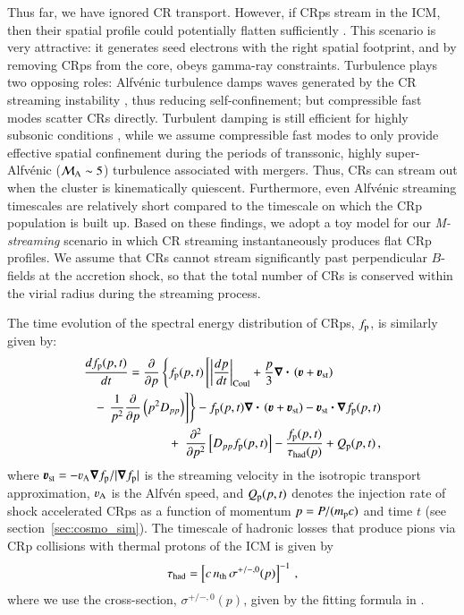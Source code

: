 \documentclass[fleqn,usenatbib,useAMS]{mnras}
\newcommand{\bcdot}{\ensuremath{%
  \mathchoice%
   {\mskip\thinmuskip\lower0.2ex\hbox{\scalebox{1.5}{$\cdot$}}\mskip\thinmuskip}}%
   {\mskip\thinmuskip\lower0.2ex\hbox{\scalebox{1.5}{$\cdot$}}\mskip\thinmuskip}%
   {\lower0.3ex\hbox{\scalebox{1.2}{$\cdot$}}}%
   {\lower0.3ex\hbox{\scalebox{1.2}{$\cdot$}}}%
}
\newcommand{\Mstream}{{\it M-streaming}\xspace}
\newcommand{\bvel}{\ensuremath{\boldsymbol{\varv}}}
\newcommand{\bnabla}{\ensuremath{\boldsymbol{\nabla}}}
\begin{document}
Thus far, we have ignored CR transport. However, if CRps stream in the ICM, then
their spatial profile could potentially flatten sufficiently
\citep{ensslin11,wiener13}. This scenario is very attractive: it generates seed
electrons with the right spatial footprint, and by removing CRps from the core,
obeys gamma-ray constraints. Turbulence plays two opposing roles: Alfv{\'e}nic
turbulence damps waves generated by the CR streaming instability
\citep{yan02,farmer04}, thus reducing self-confinement; but compressible fast
modes scatter CRs directly. Turbulent damping is still efficient for highly
subsonic conditions \citep{wiener13}, while we assume compressible fast modes to
only provide effective spatial confinement during the periods of transsonic,
highly super-Alfv{\'e}nic ($\mathcal{M}_{\rm A} \sim 5$) turbulence associated with
mergers. Thus, CRs can stream out when the cluster is kinematically
quiescent. Furthermore, even Alfv{\'e}nic streaming timescales are relatively
short \cite[$\sim 0.1-0.5$ Gyr;][]{wiener13} compared to the timescale on which
the CRp population is built up. Based on these findings, we adopt a toy model
for our \Mstream scenario in which CR streaming instantaneously produces flat
CRp profiles. We assume that CRs cannot stream significantly past perpendicular
$B$-fields at the accretion shock, so that the total number of CRs is conserved
within the virial radius during the streaming process. 

The time evolution of the spectral energy distribution of CRps,
$f_{{\mathrm{p}}}$, is similarly given by:
\begin{eqnarray}
\lefteqn{
  {{d f_{\rmn{p}}(p,t)}\over{d t}} =
  {{\partial }\over{\partial p}}
  \left\{
  f_{\rmn{p}}(p,t)\left[ \left|{{d p}\over{d t}}\right|_{\rm Coul}
    + \frac{p}{3}\bnabla\bcdot \left(\bvel+\bvel_{\rmn{st}}\right)\right.\right.}
\nonumber\\
&&-\left.\left. {1\over{p^2}}{{\partial }\over{\partial p}}\left(p^2 D_{pp}\right)
\right]\right\} - f_{\rmn{p}}(p,t) \bnabla\bcdot \left(\bvel+\bvel_{\rmn{st}}\right) 
- \bvel_{\rmn{st}}\bcdot\bnabla f_{\rmn{p}}(p,t)
\nonumber\\
&&+\,\,\, {{\partial^2 }\over{\partial p^2}}
\left[ D_{pp} f_{\rmn{p}}(p,t) \right] - {{f_{\rmn{p}}(p,t)}\over{\tau_{\rm had}(p)}}
+ Q_{\rmn{p}}(p,t)\, ,
\label{eq:FP_p}
\end{eqnarray}
where $\bvel_{\rmn{st}}=-\varv_{\rmn{A}}\bnabla f_{\rmn{p}}/|\bnabla
f_{\rmn{p}}|$ is the streaming velocity in the isotropic transport
approximation, $\varv_{\rmn{A}}$ is the Alfv\'en speed,
and $Q_{{\mathrm{p}}}(p,t)$ denotes the injection rate of shock accelerated
CRps as a function of momentum $p=P/(m_{{\mathrm{p}}} c)$ and time $t$ (see
section~\ref{sec:cosmo_sim}). The timescale of
hadronic losses that produce pions via CRp collisions with thermal
protons of the ICM is given by 
\begin{eqnarray}
  \tau_{\rm had} = \left[c\,n_{\mathrm{th}}\,\sigma^{+/-,0}(p)\right]^{-1}\,,
\end{eqnarray}
where we use the cross-section, $\sigma^{+/-,0}(p)$, given by the
fitting formula in \citet{1986ApJ...307...47D}.
\end{document}
